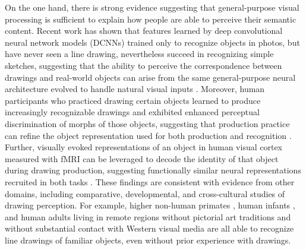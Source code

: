 \documentclass[11pt,letterpaper]{article}
\begin{document}
On the one hand, there is strong evidence suggesting that general-purpose visual processing is sufficient to explain how people are able to perceive their semantic content.
Recent work has shown that features learned by deep convolutional neural network models (DCNNs) trained only to recognize objects in photos, but have never seen a line drawing, nevertheless succeed in recognizing simple sketches, suggesting that the ability to perceive the correspondence between drawings and real-world objects can arise from the same general-purpose neural architecture evolved to handle natural visual inputs \cite{Sayim:2011bz,gibson1979ecological,fan2018common}. 
Moreover, human participants who practiced drawing certain objects learned to produce increasingly recognizable drawings and exhibited enhanced perceptual discrimination of morphs of those objects, suggesting that production practice can refine the object representation used for both production and recognition \cite{fan2018common}.
Further, visually evoked representations of an object in human visual cortex measured with fMRI can be leveraged to decode the identity of that object during drawing production, suggesting functionally similar neural representations recruited in both tasks \cite{fan2020relating}.
These findings are consistent with evidence from other domains, including comparative, developmental, and cross-cultural studies of drawing perception. 
For example, higher non-human primates \cite{tanaka2007recognition}, human infants \cite{hochberg1962pictorial}, and human adults living in remote regions without pictorial art traditions and without substantial contact with Western visual media \cite{kennedy1975outline} are all able to recognize line drawings of familiar objects, even without prior experience with drawings.
\end{document}

